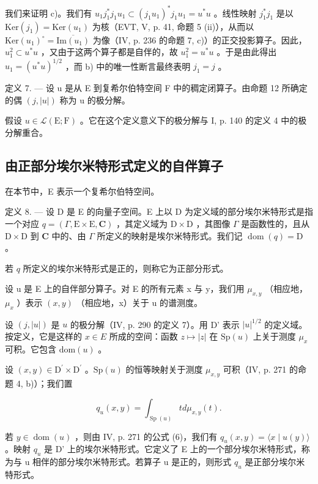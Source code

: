 我们来证明 c)。我们有 \(u_{1}j_{1}^{*}j_{1}u_{1}\subset(j_{1}u_{1})^{*}j_{1}u_{1}=u^{*}u\) 。线性映射 \(j_{1}^{*}j_{1}\) 是以 \(\mathrm{Ker}(j_{1})=\mathrm{Ker}(u_{1})\) 为核（EVT, V, p. 41, 命题 5 (ii)），从而以 \(\mathrm{Ker}(u_{1})^{\circ}=\overline{\mathrm{Im}(u_{1})}\) 为像（IV, p. 236 的命题 7, c)）的正交投影算子。因此，\(u_{1}^{2}\subset u^{*}u\) ，又由于这两个算子都是自伴的，故 \(u_{1}^{2}=u^{*}u\) 。于是由此得出 \(u_{1}=(u^{*}u)^{1/2}\) ，而 b) 中的唯一性断言最终表明 \(j_{1}=j\) 。

定义 7. --- 设 u 是从 E 到复希尔伯特空间 F 中的稠定闭算子。由命题 12 所确定的偶 \((j, |u|)\) 称为 u 的极分解。

假设 \(u \in \mathcal{L}(\mathrm{E};\mathrm{F})\) 。它在这个定义意义下的极分解与 I, p. 140 的定义 4 中的极分解重合。

\subsection{由正部分埃尔米特形式定义的自伴算子}

在本节中，E 表示一个复希尔伯特空间。

定义 8. --- 设 D 是 E 的向量子空间。E 上以 D 为定义域的部分埃尔米特形式是指一个对应 \(q = (\Gamma, \mathrm{E} \times \mathrm{E}, \mathbf{C})\) ，其定义域为 \(\mathrm{D} \times \mathrm{D}\) ，其图像 \(\Gamma\) 是函数性的，且从 \(\mathrm{D} \times \mathrm{D}\) 到 \(\mathbf{C}\) 中的、由 \(\Gamma\) 所定义的映射是埃尔米特形式。我们记 \(\operatorname{dom}(q) = \mathrm{D}\) 。

若 \(q\) 所定义的埃尔米特形式是正的，则称它为正部分形式。

设 u 是 E 上的自伴部分算子。对 E 的所有元素 x 与 y，我们用 \(\mu_{x,y}\) （相应地，\(\mu_{x}\) ）表示 \((x,y)\) （相应地，x）关于 u 的谱测度。

设 \((j, |u|)\) 是 \(u\) 的极分解（IV, p. 290 的定义 7）。用 D' 表示 \(|u|^{1/2}\) 的定义域。按定义，它是这样的 \(x \in E\) 所成的空间：函数 \(z \mapsto |z|\) 在 \(\mathrm{Sp}(u)\) 上关于测度 \(\mu_x\) 可积。它包含 \(\mathrm{dom}(u)\) 。

设 \((x,y)\in\mathrm{D}^{\prime}\times\mathrm{D}^{\prime}\) 。\(\mathrm{Sp}(u)\) 的恒等映射关于测度 \(\mu_{x,y}\) 可积（IV, p. 271 的命题 4, b)）；我们置

\[
q _ {u} (x, y) = \int_ {\operatorname{Sp} (u)} t d \mu_ {x, y} (t).
\]

若 \(y \in \operatorname{dom}(u)\) ，则由 IV, p. 271 的公式 (6)，我们有 \(q_u(x, y) = \langle x \mid u(y) \rangle\) 。映射 \(q_u\) 是 D' 上的埃尔米特形式。它定义了 E 上的一个部分埃尔米特形式，称为与 u 相伴的部分埃尔米特形式。若算子 u 是正的，则形式 \(q_u\) 是正部分埃尔米特形式。

